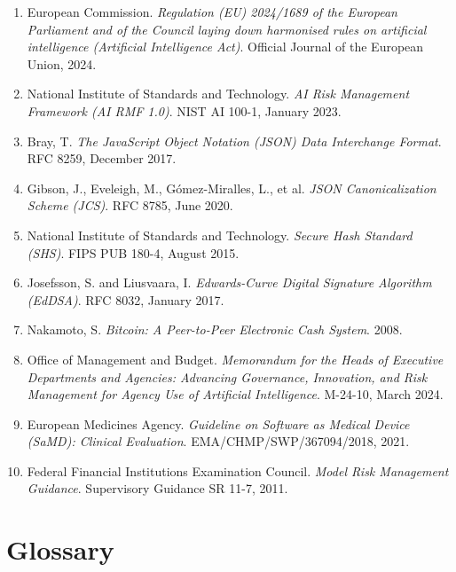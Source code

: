 \documentclass[12pt,a4paper]{article}
\begin{document}
\begin{enumerate}
\item European Commission. \textit{Regulation (EU) 2024/1689 of the European Parliament and of the Council laying down harmonised rules on artificial intelligence (Artificial Intelligence Act)}. Official Journal of the European Union, 2024.

\item National Institute of Standards and Technology. \textit{AI Risk Management Framework (AI RMF 1.0)}. NIST AI 100-1, January 2023.

\item Bray, T. \textit{The JavaScript Object Notation (JSON) Data Interchange Format}. RFC 8259, December 2017.

\item Gibson, J., Eveleigh, M., Gómez-Miralles, L., et al. \textit{JSON Canonicalization Scheme (JCS)}. RFC 8785, June 2020.

\item National Institute of Standards and Technology. \textit{Secure Hash Standard (SHS)}. FIPS PUB 180-4, August 2015.

\item Josefsson, S. and Liusvaara, I. \textit{Edwards-Curve Digital Signature Algorithm (EdDSA)}. RFC 8032, January 2017.

\item Nakamoto, S. \textit{Bitcoin: A Peer-to-Peer Electronic Cash System}. 2008.

\item Office of Management and Budget. \textit{Memorandum for the Heads of Executive Departments and Agencies: Advancing Governance, Innovation, and Risk Management for Agency Use of Artificial Intelligence}. M-24-10, March 2024.

\item European Medicines Agency. \textit{Guideline on Software as Medical Device (SaMD): Clinical Evaluation}. EMA/CHMP/SWP/367094/2018, 2021.

\item Federal Financial Institutions Examination Council. \textit{Model Risk Management Guidance}. Supervisory Guidance SR 11-7, 2011.
\end{enumerate}

\section{Glossary}
\end{document}
